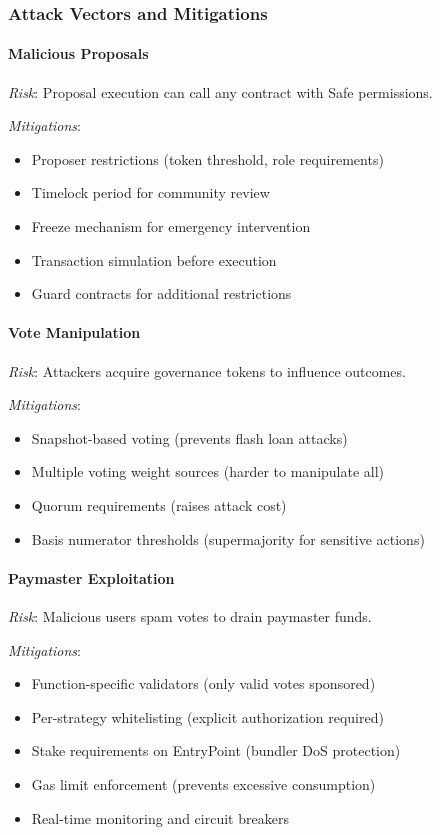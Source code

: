 \subsubsection{Attack Vectors and Mitigations}

\paragraph{Malicious Proposals}

\textit{Risk}: Proposal execution can call any contract with Safe permissions.

\textit{Mitigations}:
\begin{itemize}
    \item Proposer restrictions (token threshold, role requirements)
    \item Timelock period for community review
    \item Freeze mechanism for emergency intervention
    \item Transaction simulation before execution
    \item Guard contracts for additional restrictions
\end{itemize}

\paragraph{Vote Manipulation}

\textit{Risk}: Attackers acquire governance tokens to influence outcomes.

\textit{Mitigations}:
\begin{itemize}
    \item Snapshot-based voting (prevents flash loan attacks)
    \item Multiple voting weight sources (harder to manipulate all)
    \item Quorum requirements (raises attack cost)
    \item Basis numerator thresholds (supermajority for sensitive actions)
\end{itemize}

\paragraph{Paymaster Exploitation}

\textit{Risk}: Malicious users spam votes to drain paymaster funds.

\textit{Mitigations}:
\begin{itemize}
    \item Function-specific validators (only valid votes sponsored)
    \item Per-strategy whitelisting (explicit authorization required)
    \item Stake requirements on EntryPoint (bundler DoS protection)
    \item Gas limit enforcement (prevents excessive consumption)
    \item Real-time monitoring and circuit breakers
\end{itemize}

